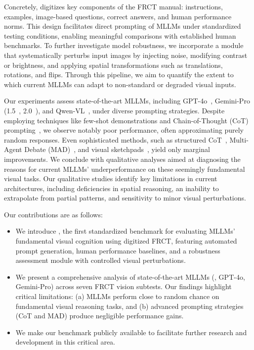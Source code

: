 Concretely, {\methodname} digitizes key components of the FRCT manual: instructions, examples, image-based questions, correct answers, and human performance norms.
This design facilitates direct prompting of MLLMs under standardized testing conditions, enabling meaningful comparisons with established human benchmarks.
To further investigate model robustness, we incorporate a module that systematically perturbs input images by injecting noise, modifying contrast or brightness, and applying spatial transformations such as translations, rotations, and flips.
Through this pipeline, we aim to quantify the extent to which current MLLMs can adapt to non-standard or degraded visual inputs.

Our experiments assess state-of-the-art MLLMs, including GPT-4o~\cite{openai2024hello}, Gemini-Pro (1.5~\cite{pichai2024our}, 2.0~\cite{pichai2024introducing}), and Qwen-VL~\cite{bai2023qwen}, under diverse prompting strategies.
Despite employing techniques like few-shot demonstrations and Chain-of-Thought (CoT) prompting~\cite{kojima2022large, wei2022chain}, we observe notably poor performance, often approximating purely random responses.
Even sophisticated methods, such as structured CoT~\cite{qiao2024prism}, Multi-Agent Debate (MAD)~\cite{liang2023leveraging}, and visual sketchpads~\cite{hu2024visual}, yield only marginal improvements.
We conclude with qualitative analyses aimed at diagnosing the reasons for current MLLMs' underperformance on these seemingly fundamental visual tasks.
Our qualitative studies identify key limitations in current architectures, including deficiencies in spatial reasoning, an inability to extrapolate from partial patterns, and sensitivity to minor visual perturbations.

Our contributions are as follows:  
\begin{itemize}[leftmargin=*]
    \item We introduce {\methodname}, the first standardized benchmark for evaluating MLLMs' fundamental visual cognition using digitized FRCT, featuring automated prompt generation, human performance baselines, and a robustness assessment module with controlled visual perturbations.
    \item We present a comprehensive analysis of state-of-the-art MLLMs (\eg, GPT-4o, Gemini-Pro) across seven FRCT vision subtests. Our findings highlight critical limitations: (a) MLLMs perform close to random chance on fundamental visual reasoning tasks, and (b) advanced prompting strategies (CoT and MAD) produce negligible performance gains.
    \item We make our {\methodname} benchmark publicly available to facilitate further research and development in this critical area.
\end{itemize}